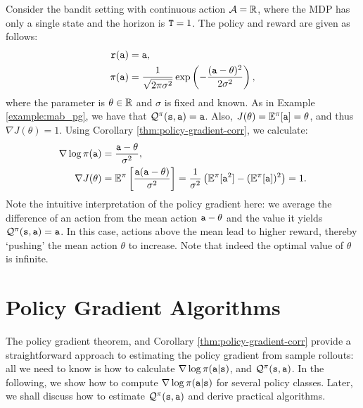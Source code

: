 \begin{example}\label{example:gaussian_bandit}
    Consider the bandit setting with continuous action $\mathcal{A} = \mathbb{R}$, where the MDP has only a single state and the horizon is ${\tt T}=1$. The policy and reward are given as follows:
\begin{equation*}
    \begin{split}
        {\tt r}({\tt a}) &= {\tt a}, \\
        \pi({\tt a}) &= \frac{1}{\sqrt{2 \pi \sigma^2}} \exp \left(- \frac{({\tt a} - \theta)^2}{2 \sigma^2}\right),
    \end{split}
\end{equation*}
where the parameter is $\theta\in\mathbb{R}$ and $\sigma$ is fixed and known.
As in Example \ref{example:mab_pg}, we have that $\mathcal{Q}^\pi({\tt s},{\tt a})={\tt a}$. 
Also, $J(\theta) = \mathbb{E}^{\pi}[{\tt a}] = \theta$, and thus $\nabla J(\theta) = 1.$
Using Corollary \ref{thm:policy-gradient-corr}, we calculate:
\begin{equation*}
    \begin{split}
        \nabla \log \pi({\tt a}) &= \frac{{\tt a} - \theta}{\sigma^2}, \\
        \nabla J(\theta) &= \mathbb{E}^{\pi} \left[\frac{{\tt a}({\tt a} - \theta)}{\sigma^2}\right] 
        = \frac{1}{\sigma^2} \left(\mathbb{E}^{\pi} [{\tt a}^2] - (\mathbb{E}^{\pi} [{\tt a}])^2\right) = 1.
    \end{split}
\end{equation*}
Note the intuitive interpretation of the policy gradient here: we average the difference of an action from the mean action ${\tt a}-\theta$ and the value it yields $\mathcal{Q}^\pi({\tt s},{\tt a})={\tt a}$. In this case, actions above the mean lead to higher reward, thereby `pushing' the mean action $\theta$ to increase. Note that indeed the optimal value of $\theta$ is infinite.
\end{example}

\section{Policy Gradient Algorithms}

The policy gradient theorem, and Corollary \ref{thm:policy-gradient-corr} provide a straightforward approach to estimating the policy gradient from sample rollouts: all we need to know is how to calculate $\nabla\log
\pi({\tt a}|{\tt s})$, and $\mathcal{Q}^\pi
({\tt s},{\tt a})$. In the following, we show how to compute $\nabla\log
\pi({\tt a}|{\tt s})$ for several policy classes. Later, we shall discuss how to estimate $\mathcal{Q}^\pi
({\tt s},{\tt a})$ and derive practical algorithms.

